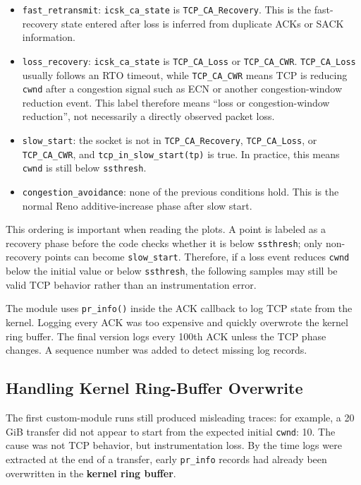 \documentclass{article}
\newcommand{\code}[1]{\texttt{#1}}
\begin{document}
\begin{itemize}
  \item \code{fast\_retransmit}: \code{icsk\_ca\_state} is \code{TCP\_CA\_Recovery}. This is the fast-recovery state entered after loss is inferred from duplicate ACKs or SACK information.
  \item \code{loss\_recovery}: \code{icsk\_ca\_state} is \code{TCP\_CA\_Loss} or \code{TCP\_CA\_CWR}. \code{TCP\_CA\_Loss} usually follows an RTO timeout, while \code{TCP\_CA\_CWR} means TCP is reducing \code{cwnd} after a congestion signal such as ECN or another congestion-window reduction event. This label therefore means ``loss or congestion-window reduction'', not necessarily a directly observed packet loss.
  \item \code{slow\_start}: the socket is not in \code{TCP\_CA\_Recovery}, \code{TCP\_CA\_Loss}, or \code{TCP\_CA\_CWR}, and \code{tcp\_in\_slow\_start(tp)} is true. In practice, this means \code{cwnd} is still below \code{ssthresh}.
  \item \code{congestion\_avoidance}: none of the previous conditions hold. This is the normal Reno additive-increase phase after slow start.
\end{itemize}

This ordering is important when reading the plots. A point is labeled as a recovery phase before the code checks 
whether it is below \code{ssthresh}; only non-recovery points can become \code{slow\_start}. Therefore, if a loss 
event reduces \code{cwnd} below the initial value or below \code{ssthresh}, the following samples may still be valid 
TCP behavior rather than an instrumentation error.

The module uses \code{pr\_info()} inside the ACK callback to log TCP state from the kernel. Logging every ACK was too 
expensive and quickly overwrote the kernel ring buffer. The final version logs every 100th ACK unless the TCP phase 
changes. A sequence number was added to detect missing log records.

\subsection{Handling Kernel Ring-Buffer Overwrite}


The first custom-module runs still produced misleading traces: for example, a 20 GiB transfer did not appear to start 
from the expected initial \code{cwnd}: 10. The cause was not TCP behavior, but instrumentation loss. By the time logs 
were extracted at the end of a transfer, early \code{pr\_info} records had already been overwritten in the \textbf{kernel ring buffer}.
\end{document}
